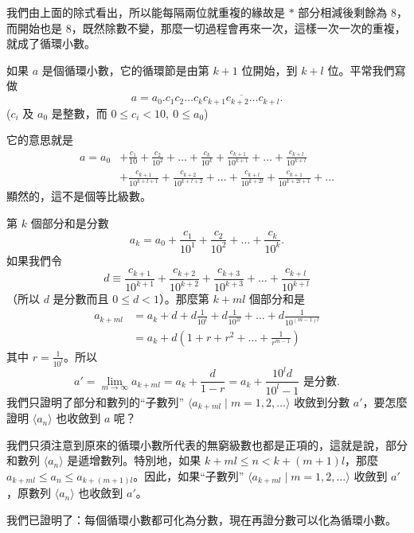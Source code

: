 我們由上面的除式看出，所以能每隔兩位就重複的緣故是 $*$ 部分相減後剩餘為 8，而開始也是 8，既然除數不變，那麼一切過程會再來一次，這樣一次一次的重複，就成了循環小數。

如果 $a$ 是個循環小數，它的循環節是由第 $k+1$ 位開始，到 $k+l$ 位。平常我們寫做
\[
a = a_0.c_1 c_2 \dots c_k \overline{c_{k+1} c_{k+2} \dots c_{k+l}}.
\]
($c_i$ 及 $a_0$ 是整數，而 $0\le c_i < 10,\ 0\le a_0$)

它的意思就是
\begin{align*}
a = a_0 &+ \frac{c_1}{10} + \frac{c_2}{10^2} + \dots + \frac{c_k}{10^k} + \frac{c_{k+1}}{10^{k+1}} + \dots + \frac{c_{k+l}}{10^{k+l}} \\
&+ \frac{c_{k+1}}{10^{k+l+1}} + \frac{c_{k+2}}{10^{k+l+2}} + \dots + \frac{c_{k+l}}{10^{k+2l}} + \frac{c_{k+1}}{10^{k+2l+1}} + \dots
\end{align*}
顯然的，這不是個等比級數。

第 $k$ 個部分和是分數
\[
a_k = a_0 + \frac{c_1}{10^1} + \frac{c_2}{10^2} + \dots + \frac{c_k}{10^k}.
\]
如果我們令
\[
d \equiv \frac{c_{k+1}}{10^{k+1}} + \frac{c_{k+2}}{10^{k+2}} + \frac{c_{k+3}}{10^{k+3}} + \dots + \frac{c_{k+l}}{10^{k+l}}
\]
（所以 $d$ 是分數而且 $0\le d < 1$）。那麼第 $k+ml$ 個部分和是\label{note:b2-ch2-p56-partial-sum-r}
\begin{align*}
a_{k+ml} &= a_k + d + d\frac{1}{10^l} + d\frac{1}{10^{2l}} + \dots + d\frac{1}{10^{(m-1)l}} \\
&= a_k + d\left(1+r+r^2+\dots+\frac{1}{r^{m-1}}\right)
\end{align*}
其中 $r = \frac{1}{10^l}$。所以
\[
a' = \lim_{m\to\infty} a_{k+ml} = a_k + \frac{d}{1-r} = a_k + \frac{10^l d}{10^l - 1} \text{ 是分數}.
\]
我們只證明了部分和數列的“子數列” $\langle a_{k+ml} \mid m=1, 2, \dots \rangle$ 收斂到分數 $a'$，要怎麼證明 $\langle a_n \rangle$ 也收斂到 $a$ 呢？

我們只須注意到原來的循環小數所代表的無窮級數也都是正項的，這就是說，部分和數列 $\langle a_n \rangle$ 是遞增數列。特別地，如果 $k+ml \le n < k+(m+1)l$，那麼 $a_{k+ml} \le a_n \le a_{k+(m+1)l}$。因此，如果“子數列” $\langle a_{k+ml} \mid m=1, 2, \dots \rangle$ 收斂到 $a'$，原數列 $\langle a_n \rangle$ 也收斂到 $a'$。

我們已證明了：每個循環小數都可化為分數，現在再證分數可以化為循環小數。

